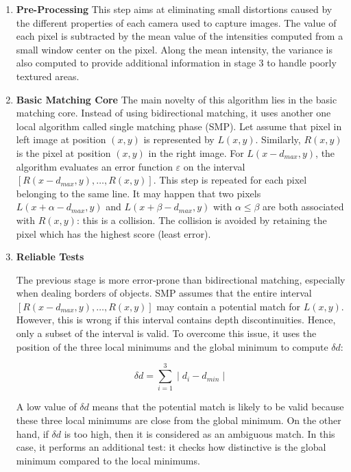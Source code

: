 \documentclass[11pt]{report}
\begin{document}
\begin{enumerate}
  \item \textbf{Pre-Processing} This step aims at eliminating small distortions caused by the different properties of each camera used to capture images. The value of each pixel is subtracted by the mean value of the intensities computed from a small window center on the pixel. Along the mean intensity, the variance is also computed to provide additional information in stage 3 to handle poorly textured areas.

  \item \textbf{Basic Matching Core}
The main novelty of this algorithm lies in the basic matching core. Instead of using bidirectional matching, it uses another one local algorithm called single matching phase (SMP). Let assume that pixel in left image at position $(x, y)$ is represented by $L(x, y)$. Similarly, $R(x, y)$ is the pixel at position $(x, y)$ in the right image. For $L(x-d_{max}, y)$, the algorithm evaluates an error function $\varepsilon$ on the interval $[R(x-d_{max}, y), \hdots, R(x,y)]$. This step is repeated for each pixel belonging to the same line. It may happen that two pixels $L(x+\alpha - d_{max}, y)$ and $L(x+\beta - d_{max}, y)$ with $\alpha \leq \beta$ are both associated with $R(x, y)$: this is a collision. The collision is avoided by retaining the pixel which has the highest score (least error).

  \item \textbf{Reliable Tests}

The previous stage is more error-prone than bidirectional matching, especially when dealing borders of objects. SMP assumes that the entire interval $[R(x-d_{max}, y), \hdots, R(x,y)]$ may contain a potential match for $L(x, y)$. However, this is wrong if this interval contains depth discontinuities. Hence, only a subset of the interval is valid. To overcome this issue, it uses the position of the three local minimums and the global minimum to compute $\delta d$:

\begin{equation}
  \delta d = \sum_{i=1}^{3} \mid d_i - d_{min} \mid 
\end{equation}

A low value of $\delta d$ means that the potential match is likely to be valid because these three local minimums are close from the global minimum. On the other hand, if $\delta d$ is too high, then it is considered as an ambiguous match. In this case, it performs an additional test: it checks how distinctive is the global minimum compared to the local minimums.


\end{enumerate}
\end{document}

